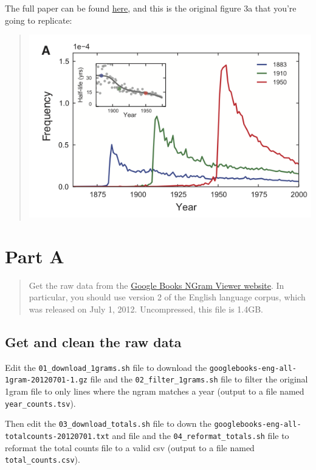 \documentclass[
]{article}
\begin{document}
The full paper can be found
\href{https://aidenlab.org/papers/Science.Culturomics.pdf}{here}, and
this is the original figure 3a that you're going to replicate:

\begin{quote}
\includegraphics{michel_fig_3a.png}
\end{quote}

\hypertarget{part-a}{%
\section{Part A}\label{part-a}}

\begin{quote}
Get the raw data from the
\href{http://storage.googleapis.com/books/ngrams/books/datasetsv2.html}{Google
Books NGram Viewer website}. In particular, you should use version 2 of
the English language corpus, which was released on July 1, 2012.
Uncompressed, this file is 1.4GB.
\end{quote}

\hypertarget{get-and-clean-the-raw-data}{%
\subsection{Get and clean the raw
data}\label{get-and-clean-the-raw-data}}

Edit the \texttt{01\_download\_1grams.sh} file to download the
\texttt{googlebooks-eng-all-1gram-20120701-1.gz} file and the
\texttt{02\_filter\_1grams.sh} file to filter the original 1gram file to
only lines where the ngram matches a year (output to a file named
\texttt{year\_counts.tsv}).

Then edit the \texttt{03\_download\_totals.sh} file to down the
\texttt{googlebooks-eng-all-totalcounts-20120701.txt} and file and the
\texttt{04\_reformat\_totals.sh} file to reformat the total counts file
to a valid csv (output to a file named \texttt{total\_counts.csv}).
\end{document}
